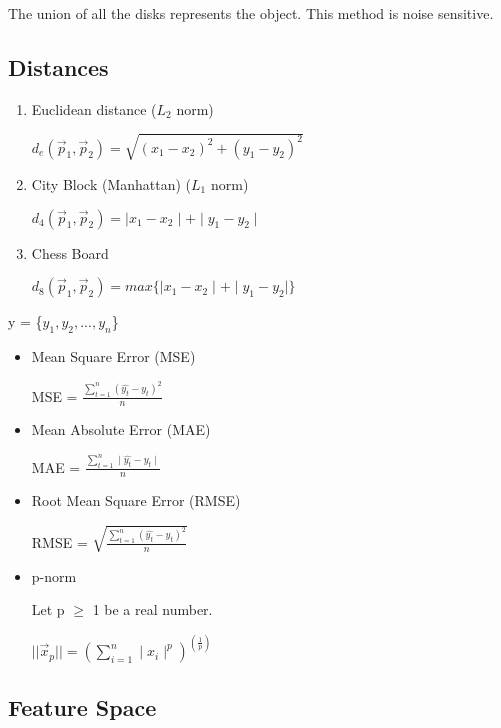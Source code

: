 \documentclass{article}
\begin{document}
\begin{multicols}{2}
  \vspace{2mm}

  The union of all the disks represents the object.
  This method is noise sensitive.

\subsection{Distances}

\begin{enumerate}
  \item {Euclidean distance ($L_2$ norm)}
  
  $d_e(\vec p_1, \vec p_2) = \sqrt{(x_1 - x_2)^2 + (y_1 - y_2)^2}$

  \item {City Block (Manhattan) ($L_1$ norm)}
  
  $d_4(\vec p_1, \vec p_2) = \mid x_1 - x_2 \mid + \mid y_1 - y_2 \mid$

  \item {Chess Board}
  
  $d_8(\vec p_1, \vec p_2) = max\{\mid x_1 - x_2 \mid + \mid y_1 - y_2 \mid\}$

\end{enumerate}

y = \{$y_1, y_2, ..., y_n$\}

\begin{itemize}
  \item {Mean Square Error (MSE)}
  
  MSE = $\frac{\sum_{t=1}^n (\hat{y_t} - y_t)^2}{n}$

  \item {Mean Absolute Error (MAE)}
  
  MAE = $\frac{\sum_{t=1}^n \mid \hat{y_t} - y_t \mid}{n}$

  \item {Root Mean Square Error (RMSE)}
  
  RMSE = $\sqrt{\frac{\sum_{t=1}^n (\hat{y_t} - y_t)^2}{n}}$

  \item {p-norm}
  
  Let p $\geq$ 1 be a real number.

  $||\vec x_p|| = (\sum_{i=1}^n \mid x_i \mid ^p)^(\frac{1}{p})$

\end{itemize}

\subsection{Feature Space}


\end{multicols}
\end{document}
